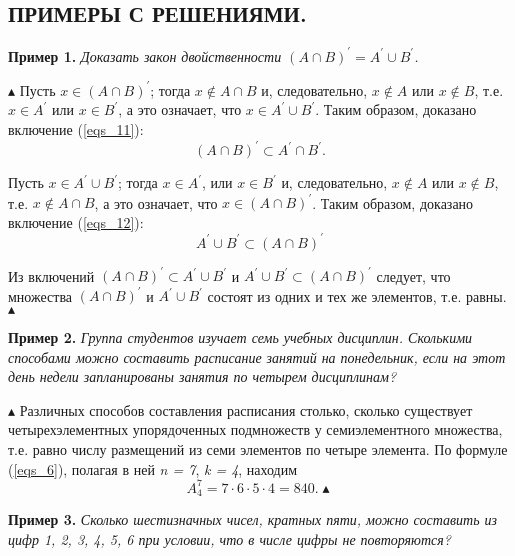\documentclass{article}
\begin{document}
    \subsection*{ПРИМЕРЫ С РЕШЕНИЯМИ.}
    \textbf{Пример 1.} \textit{Доказать закон двойственности $(A \cap B)^\prime=A^\prime \cup B^\prime$.}

    \fontsize{13}{10}\selectfont $\blacktriangle$ Пусть $x \in (A \cap B)^\prime$; тогда $x \not\in A \cap B$ и, следовательно, $x \not\in A$ или $x \not\in B$, т.е. $x \in A^\prime$ или $x \in B^\prime$, а это означает, что $x \in A^\prime \cup B^\prime$.
    Таким образом, доказано включение (\ref{eqs_11}):
    \begin{equation}
        \label{eqs_11}
        (A \cap B)^\prime \subset A^\prime \cap B^\prime.
    \end{equation}

    Пусть $x \in A^\prime \cup B^\prime$; тогда $x \in A^\prime$, или $x \in B^\prime$ и, следовательно, $x \not\in A$ или $x \not\in B$, т.е. $x \not\in A \cap B$,  а это означает, что $x \in (A \cap B)^\prime$. Таким образом, доказано включение (\ref{eqs_12}):
    \begin{equation}
        \label{eqs_12}
        A^\prime \cup B^\prime \subset (A \cap B)^\prime
    \end{equation}

    Из включений $(A \cap B)^\prime \subset A^\prime \cup B^\prime$ и $A^\prime \cup B^\prime \subset (A \cap B)^\prime$ следует, что множества $(A \cap B)^\prime$ и $A^\prime \cup B^\prime$ состоят из одних и тех же элементов, т.е. равны. $\blacktriangle$

    \textbf{Пример 2.} \textit{Группа студентов изучает семь учебных дисциплин. Сколькими способами можно составить расписание занятий на понедельник, если на этот день недели запланированы занятия по четырем дисциплинам?}

    \fontsize{13}{10}\selectfont $\blacktriangle$ Различных способов составления расписания столько, сколько существует четырехэлементных упорядоченных подмножеств у семиэлементного множества, т.е. равно числу размещений из семи элементов по четыре элемента. По формуле (\ref{eqs_6}), полагая в ней \textit{n = 7}, \textit{k = 4}, находим
    \begin{equation*}
        A_4^7=7\cdot6\cdot5\cdot4=840.\blacktriangle
    \end{equation*}

    \textbf{Пример 3.} \textit{Сколько шестизначных чисел, кратных пяти, можно составить из цифр 1, 2, 3, 4, 5, 6 при условии, что в числе цифры не повторяются?}
\end{document}
